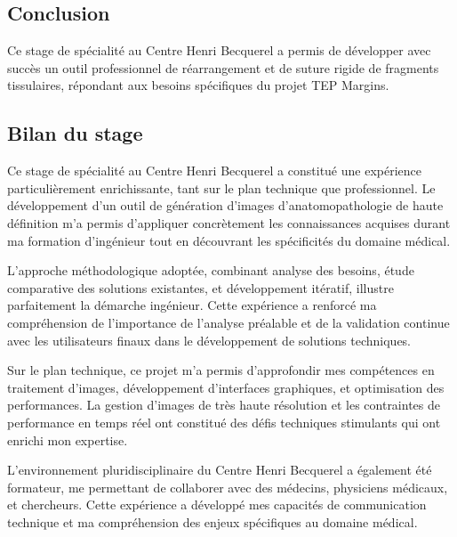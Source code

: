 \documentclass[12pt,a4paper]{report}
\let\oldchapter\chapter
\renewcommand{\chapter}{\clearpage\oldchapter}
\begin{document}
\begin{}
\begin{}
\begin{}
\begin{}
\chapter{Conclusion}

\clearpage

\vspace{0.5em}

\begin{center}
Ce stage de spécialité au Centre Henri Becquerel a permis de développer avec succès un outil professionnel de réarrangement et de suture rigide de fragments tissulaires, répondant aux besoins spécifiques du projet TEP Margins.
\end{center}

\vspace{1em}

\section{Bilan du stage}

Ce stage de spécialité au Centre Henri Becquerel a constitué une expérience particulièrement enrichissante, tant sur le plan technique que professionnel. Le développement d'un outil de génération d'images d'anatomopathologie de haute définition m'a permis d'appliquer concrètement les connaissances acquises durant ma formation d'ingénieur tout en découvrant les spécificités du domaine médical.

L'approche méthodologique adoptée, combinant analyse des besoins, étude comparative des solutions existantes, et développement itératif, illustre parfaitement la démarche ingénieur. Cette expérience a renforcé ma compréhension de l'importance de l'analyse préalable et de la validation continue avec les utilisateurs finaux dans le développement de solutions techniques.

Sur le plan technique, ce projet m'a permis d'approfondir mes compétences en traitement d'images, développement d'interfaces graphiques, et optimisation des performances. La gestion d'images de très haute résolution et les contraintes de performance en temps réel ont constitué des défis techniques stimulants qui ont enrichi mon expertise.

L'environnement pluridisciplinaire du Centre Henri Becquerel a également été formateur, me permettant de collaborer avec des médecins, physiciens médicaux, et chercheurs. Cette expérience a développé mes capacités de communication technique et ma compréhension des enjeux spécifiques au domaine médical.


\end{}
\end{}
\end{}
\end{}
\end{document}
